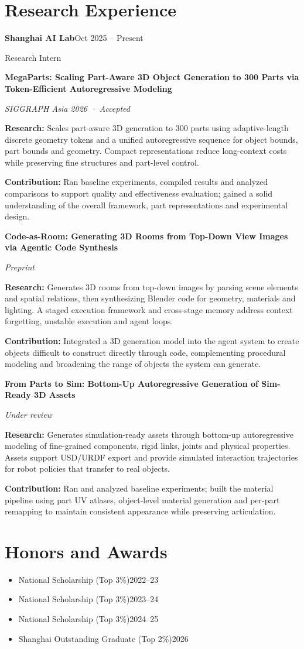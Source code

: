 \documentclass[a4paper,11pt]{article}
\newcommand{\resumeSubHeadingListStart}{\begin{itemize}[leftmargin=0.15in,label={},topsep=2pt,itemsep=2pt,parsep=0pt]}
\newcommand{\resumeSubHeadingListEnd}{\end{itemize}}
\newcommand{\researchEntry}[4]{%
  \par\addvspace{10pt}\noindent
  {\normalsize\bfseries #1\par}\nopagebreak
  {\footnotesize\itshape #2\par}\nopagebreak\vspace{2pt}
  {\small\noindent\textbf{Research: }#3\par}\nopagebreak\vspace{2pt}
  {\small\noindent\textbf{Contribution: }#4\par}
}
\begin{document}
\section{Research Experience}
\noindent\textbf{Shanghai AI Lab}\hfill Oct 2025 -- Present\par
{\small Research Intern\par}
\researchEntry{MegaParts: Scaling Part-Aware 3D Object Generation to 300 Parts via Token-Efficient Autoregressive Modeling}{SIGGRAPH Asia 2026 · Accepted}{Scales part-aware 3D generation to 300 parts using adaptive-length discrete geometry tokens and a unified autoregressive sequence for object bounds, part bounds and geometry. Compact representations reduce long-context costs while preserving fine structures and part-level control.}{Ran baseline experiments, compiled results and analyzed comparisons to support quality and effectiveness evaluation; gained a solid understanding of the overall framework, part representations and experimental design.}
\researchEntry{Code-as-Room: Generating 3D Rooms from Top-Down View Images via Agentic Code Synthesis}{Preprint}{Generates 3D rooms from top-down images by parsing scene elements and spatial relations, then synthesizing Blender code for geometry, materials and lighting. A staged execution framework and cross-stage memory address context forgetting, unstable execution and agent loops.}{Integrated a 3D generation model into the agent system to create objects difficult to construct directly through code, complementing procedural modeling and broadening the range of objects the system can generate.}
\researchEntry{From Parts to Sim: Bottom-Up Autoregressive Generation of Sim-Ready 3D Assets}{Under review}{Generates simulation-ready assets through bottom-up autoregressive modeling of fine-grained components, rigid links, joints and physical properties. Assets support USD/URDF export and provide simulated interaction trajectories for robot policies that transfer to real objects.}{Ran and analyzed baseline experiments; built the material pipeline using part UV atlases, object-level material generation and per-part remapping to maintain consistent appearance while preserving articulation.}

\section{Honors and Awards}
\resumeSubHeadingListStart
\item\small National Scholarship (Top 3\%)\hfill 2022--23
\item\small National Scholarship (Top 3\%)\hfill 2023--24
\item\small National Scholarship (Top 3\%)\hfill 2024--25
\item\small Shanghai Outstanding Graduate (Top 2\%)\hfill 2026
\resumeSubHeadingListEnd
\end{document}
